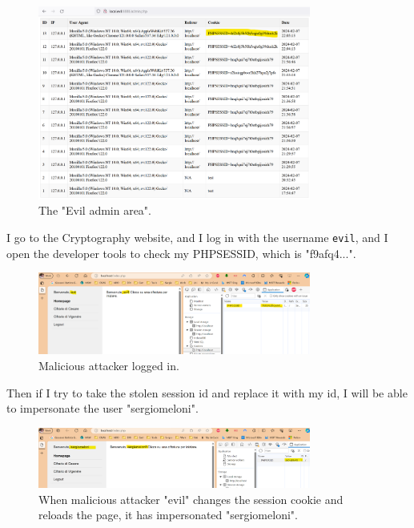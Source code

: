 \documentclass{article}
\begin{document}
\begin{figure}[h]
\centering
\includegraphics[width=0.8\textwidth]{images/15.png}
\caption{The "Evil admin area".}
\label{fig:sesshi4}
\end{figure}

I go to the Cryptography website, and I log in with the username \texttt{evil}, and I open the developer tools to check my PHPSESSID, which is "f9afq4...".

\begin{figure}[h]
\centering
\includegraphics[width=0.8\textwidth]{images/16.png}
\caption{Malicious attacker logged in.}
\label{fig:sesshi5}
\end{figure}

Then if I try to take the stolen session id and replace it with my id, I will be able to impersonate the user "sergiomeloni".

\begin{figure}[h]
\centering
\includegraphics[width=0.8\textwidth]{images/17.png}
\caption{When malicious attacker "evil" changes the session cookie and reloads the page, it has impersonated "sergiomeloni".}
\label{fig:sesshi6}
\end{figure}
\end{document}
